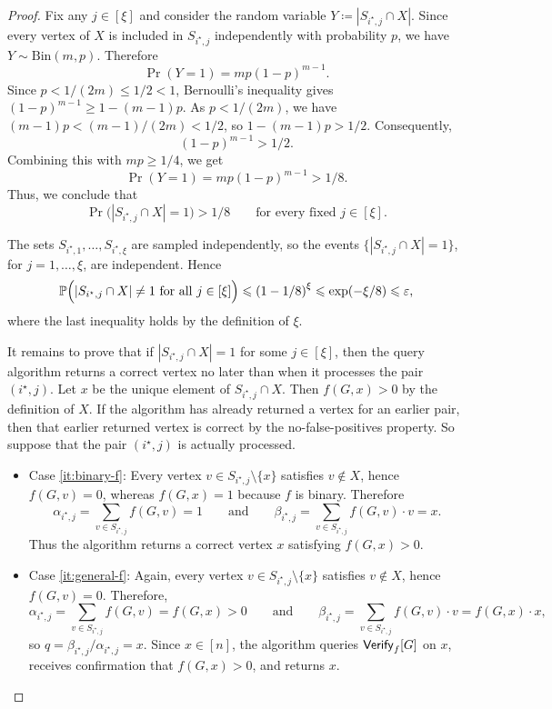 \begin{proof}
Fix any $j\in [\xi]$ and consider the random variable $Y\coloneqq |S_{i^\star,j}\cap X|$.
Since every vertex of $X$ is included in $S_{i^\star,j}$ independently with probability $p$, we have $Y\sim\mathrm{Bin}(m,p)$.
Therefore \[\Pr(Y=1)=mp(1-p)^{m-1}.\]
Since $p<1/(2m)\le 1/2<1$, Bernoulli's inequality gives $(1-p)^{m-1}\ge 1-(m-1)p$.
As $p<1/(2m)$, we have $(m-1)p < (m-1)/(2m) < 1/2$, so $1-(m-1)p > 1/2$.
Consequently, \[(1-p)^{m-1} > 1/2.\]
Combining this with $mp\ge 1/4$, we get \[\Pr(Y=1)=mp(1-p)^{m-1} > 1/8.\]
Thus, we conclude that \[\Pr\bigl(|S_{i^\star,j}\cap X|=1\bigr) > 1/8\qquad\textrm{for every fixed }j\in [\xi].\]

The sets $S_{i^\star,1},\dots,S_{i^\star,\xi}$ are sampled independently, so the events $\bigl\{|S_{i^\star,j}\cap X|=1\bigr\}$, for $j=1,\dots,\xi$, are independent.
Hence \[\mathbb{P}\Bigl(|S_{i^\star,j}\cap X|\neq 1\textrm{ for all }j\in [\xi]\Bigr) \leqslant \left(1-1/8\right)^\xi \leqslant \exp\!\left(-\xi/8\right) \leqslant \varepsilon,\]
where the last inequality holds by the definition of $\xi$.

It remains to prove that if $|S_{i^\star,j}\cap X|=1$ for some $j\in[\xi]$, then the query algorithm returns a correct vertex no later than when it processes the pair $(i^\star,j)$.
Let $x$ be the unique element of $S_{i^\star,j}\cap X$.
Then $f(G,x)>0$ by the definition of $X$.
If the algorithm has already returned a vertex for an earlier pair, then that earlier returned vertex is correct by the no-false-positives property.
So suppose that the pair $(i^\star,j)$ is actually processed.

\begin{itemize}
\item Case \ref{it:binary-f}: Every vertex $v\in S_{i^\star,j}\setminus\{x\}$ satisfies $v\notin X$, hence $f(G,v)=0$, whereas $f(G,x)=1$ because $f$ is binary.
Therefore \[\alpha_{i^\star,j}=\sum_{v\in S_{i^\star,j}} f(G,v)=1\qquad \textrm{and}\qquad \beta_{i^\star,j}=\sum_{v\in S_{i^\star,j}} f(G,v)\cdot v=x.\]
Thus the algorithm returns a correct vertex $x$ satisfying $f(G,x)>0$.
\item Case \ref{it:general-f}: Again, every vertex $v\in S_{i^\star,j}\setminus\{x\}$ satisfies $v\notin X$, hence $f(G,v)=0$.
Therefore,
\[\alpha_{i^\star,j}=\sum_{v\in S_{i^\star,j}} f(G,v)=f(G,x)>0\qquad\textrm{and}\qquad \beta_{i^\star,j}=\sum_{v\in S_{i^\star,j}} f(G,v)\cdot v=f(G,x)\cdot x,\]
so $q=\beta_{i^\star,j}/\alpha_{i^\star,j}=x$.
Since $x\in[n]$, the algorithm queries $\mathsf{Verify}_f[G]$ on $x$, receives confirmation that $f(G,x)>0$, and returns $x$.
\end{itemize}


\end{proof}
